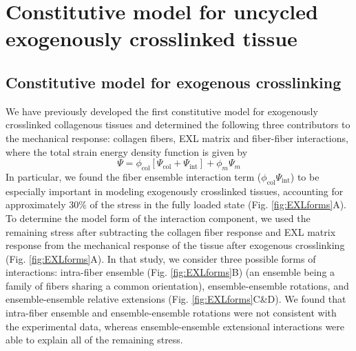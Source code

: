 

\section{Constitutive model for uncycled exogenously crosslinked tissue}


\subsection{Constitutive model for exogenous crosslinking}

	We have previously developed the first constitutive model for exogenously crosslinked collagenous tissues \cite{sacks_novel_2016} and determined the following three contributors to the mechanical response: collagen fibers, EXL matrix and fiber-fiber interactions, where the total strain energy density function is given by
\begin{equation} \label{eq:totalstrainenergy}
    \Psi = \phi_\mathrm{col} \left[ \Psi_\mathrm{col} + \Psi_\mathrm{int}\right] + \phi_m \Psi_m
\end{equation}
	In particular, we found the fiber ensemble interaction term ($\phi_\mathrm{col} \Psi_\mathrm{int}$) to be especially important in modeling exogenously crosslinked tissues, accounting for approximately 30\% of the stress in the fully loaded state (Fig. \ref{fig:EXLforms}A). To determine the model form of the interaction component, we used the remaining stress after subtracting the collagen fiber response and EXL matrix response from the mechanical response of the tissue after exogenous crosslinking (Fig. \ref{fig:EXLforms}A). In that study, we consider three possible forms of interactions: intra-fiber ensemble (Fig. \ref{fig:EXLforms}B) (an ensemble being a family of fibers sharing a common orientation), ensemble-ensemble rotations, and ensemble-ensemble relative extensions (Fig. \ref{fig:EXLforms}C\&D). We found that intra-fiber ensemble and ensemble-ensemble rotations were not consistent with the experimental data, whereas ensemble-ensemble extensional interactions were able to explain all of the remaining stress. 
	
